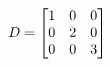 \documentclass[preview]{standalone}
\begin{document}
\begin{align*}
\special{dvisvgm:raw <g id='unique000'>}D = \begin{bmatrix} 1 & 0 & 0 \\ 0 & 2 & 0 \\ 0 & 0 & 3 \end{bmatrix}\special{dvisvgm:raw </g>}
\end{align*}
\end{document}
